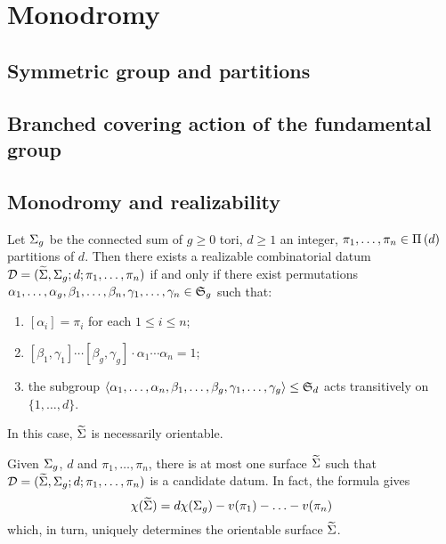 \chapter{Monodromy}

\section{Symmetric group and partitions}

\section{Branched covering action of the fundamental group}

\section{Monodromy and realizability}

\begin{proposition}\label{monodromy:th:monodromy-realizability-orientable}
Let $\Sigma_{g}$ be the connected sum of $g\ge 0$ tori, $d\ge 1$ an integer, $\pi_1,\ldots,\pi_n\in\Pi\left(d\right)$ partitions of $d$. Then there exists a realizable combinatorial datum $\mathcal{D}=(\widetilde{\Sigma},\Sigma_{g};d;\pi_1,\ldots,\pi_n)$ if and only if there exist permutations $\alpha_1,\ldots,\alpha_g,\beta_1,\ldots,\beta_n,\gamma_1,\ldots,\gamma_n\in\symgroup[g]$ such that:
\begin{enumerate}
\item $[\alpha_i]=\pi_i$ for each $1\le i\le n$;
\item $[\beta_1,\gamma_1]\cdots[\beta_g,\gamma_g]\cdot\alpha_1\cdots\alpha_n=1$;
\item the subgroup $\angled{\alpha_1,\ldots,\alpha_n,\beta_1,\ldots,\beta_g,\gamma_1,\ldots,\gamma_g}\subgroup\symgroup[d]$ acts transitively on $\{1,\ldots,d\}$.
\end{enumerate}
In this case, $\widetilde{\Sigma}$ is necessarily orientable.
\end{proposition}
\begin{remark}\label{monodromy:rm:sigma-tilde-unique-orientable}
Given $\Sigma_{g}$, $d$ and $\pi_1,\ldots,\pi_n$, there is at most one surface $\widetilde{\Sigma}$ such that $\mathcal{D}=(\widetilde{\Sigma},\Sigma_{g};d;\pi_1,\ldots,\pi_n)$ is a candidate datum. In fact, the \RH{} formula gives
\[
\chi(\widetilde{\Sigma})=d\chi(\Sigma_{g})-v(\pi_1)-\ldots-v(\pi_n)
\]
which, in turn, uniquely determines the orientable surface $\widetilde{\Sigma}$.
\end{remark}

